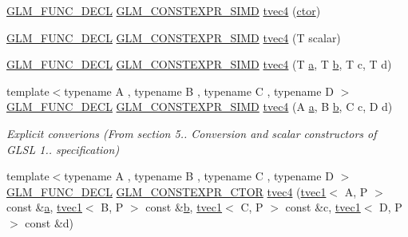\begin{DoxyCompactItemize}
\item 
\mbox{\hyperlink{setup_8hpp_ab2d052de21a70539923e9bcbf6e83a51}{G\+L\+M\+\_\+\+F\+U\+N\+C\+\_\+\+D\+E\+CL}} \mbox{\hyperlink{setup_8hpp_ae5de828d10226b21e2123dd61f3cb5ed}{G\+L\+M\+\_\+\+C\+O\+N\+S\+T\+E\+X\+P\+R\+\_\+\+S\+I\+MD}} \mbox{\hyperlink{structglm_1_1tvec4_a9b01006ba780e0bc5858eca39f9e10f7}{tvec4}} (\mbox{\hyperlink{namespaceglm_a807df837905ec286f806a536af03b57f}{ctor}})
\item 
\mbox{\hyperlink{setup_8hpp_ab2d052de21a70539923e9bcbf6e83a51}{G\+L\+M\+\_\+\+F\+U\+N\+C\+\_\+\+D\+E\+CL}} \mbox{\hyperlink{setup_8hpp_ae5de828d10226b21e2123dd61f3cb5ed}{G\+L\+M\+\_\+\+C\+O\+N\+S\+T\+E\+X\+P\+R\+\_\+\+S\+I\+MD}} \mbox{\hyperlink{structglm_1_1tvec4_acf5257ae317d955cb7dec58f76369539}{tvec4}} (T scalar)
\item 
\mbox{\hyperlink{setup_8hpp_ab2d052de21a70539923e9bcbf6e83a51}{G\+L\+M\+\_\+\+F\+U\+N\+C\+\_\+\+D\+E\+CL}} \mbox{\hyperlink{setup_8hpp_ae5de828d10226b21e2123dd61f3cb5ed}{G\+L\+M\+\_\+\+C\+O\+N\+S\+T\+E\+X\+P\+R\+\_\+\+S\+I\+MD}} \mbox{\hyperlink{structglm_1_1tvec4_a96d370c6c8e430a96a581c3c31c93091}{tvec4}} (T \mbox{\hyperlink{glad_8h_ac8729153468b5dcf13f971b21d84d4e5}{a}}, T \mbox{\hyperlink{glad_8h_a6eba317e3cf44d6d26c04a5a8f197dcb}{b}}, T c, T d)
\item 
{\footnotesize template$<$typename A , typename B , typename C , typename D $>$ }\\\mbox{\hyperlink{setup_8hpp_ab2d052de21a70539923e9bcbf6e83a51}{G\+L\+M\+\_\+\+F\+U\+N\+C\+\_\+\+D\+E\+CL}} \mbox{\hyperlink{setup_8hpp_ae5de828d10226b21e2123dd61f3cb5ed}{G\+L\+M\+\_\+\+C\+O\+N\+S\+T\+E\+X\+P\+R\+\_\+\+S\+I\+MD}} \mbox{\hyperlink{structglm_1_1tvec4_a7beaaa5706db4ba4d8c5eee7f60e66bf}{tvec4}} (A \mbox{\hyperlink{glad_8h_ac8729153468b5dcf13f971b21d84d4e5}{a}}, B \mbox{\hyperlink{glad_8h_a6eba317e3cf44d6d26c04a5a8f197dcb}{b}}, C c, D d)
\begin{DoxyCompactList}\small\item\em Explicit converions (From section 5.. Conversion and scalar constructors of G\+L\+SL 1.. specification) \end{DoxyCompactList}\item 
{\footnotesize template$<$typename A , typename B , typename C , typename D $>$ }\\\mbox{\hyperlink{setup_8hpp_ab2d052de21a70539923e9bcbf6e83a51}{G\+L\+M\+\_\+\+F\+U\+N\+C\+\_\+\+D\+E\+CL}} \mbox{\hyperlink{setup_8hpp_ad34178a09666081abdb573c14d1f4a5a}{G\+L\+M\+\_\+\+C\+O\+N\+S\+T\+E\+X\+P\+R\+\_\+\+C\+T\+OR}} \mbox{\hyperlink{structglm_1_1tvec4_a32b6947cf8247a0a6a94abced04482f6}{tvec4}} (\mbox{\hyperlink{structglm_1_1tvec1}{tvec1}}$<$ A, P $>$ const \&\mbox{\hyperlink{glad_8h_ac8729153468b5dcf13f971b21d84d4e5}{a}}, \mbox{\hyperlink{structglm_1_1tvec1}{tvec1}}$<$ B, P $>$ const \&\mbox{\hyperlink{glad_8h_a6eba317e3cf44d6d26c04a5a8f197dcb}{b}}, \mbox{\hyperlink{structglm_1_1tvec1}{tvec1}}$<$ C, P $>$ const \&c, \mbox{\hyperlink{structglm_1_1tvec1}{tvec1}}$<$ D, P $>$ const \&d)

\end{DoxyCompactItemize}
